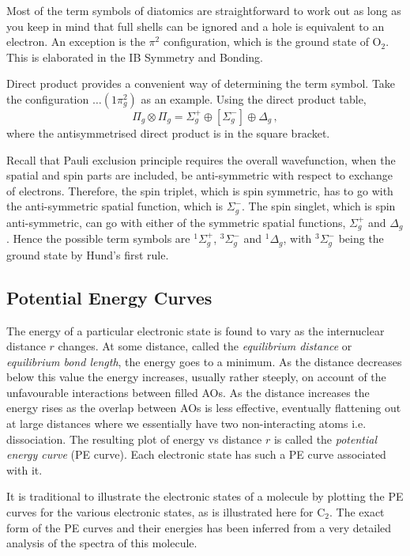 \documentclass{article}
\theoremstyle{plain}\theoremheaderfont{\normalfont\itshape}\theorembodyfont{\rmfamily}\theoremseparator{.}\newtheorem*{rem}{Remark}\newtheorem*{ex}{Example}\newtheorem*{proof}{Proof}\newtheorem*{altp}{Alternative proof}
\theoremstyle{plain}\theoremheaderfont{\normalfont\bfseries}\theorembodyfont{\rmfamily}\theoremseparator{.}\newtheorem{thm}{Theorem}[section]\newtheorem{lem}[thm]{Lemma}\newtheorem{prop}[thm]{Proposition}\newtheorem*{cor}{Corollary}\newtheorem{defn}[thm]{Definition}\newtheorem{clm}[thm]{Claim}\newtheorem{clminproof}{Claim}\newtheorem{pos}{Postulate}[section]
\theoremstyle{break}\theoremheaderfont{\normalfont\itshape}\theorembodyfont{\rmfamily}\theoremseparator{.\medskip}\newtheorem*{proofskip}{Proof}\newtheorem*{exs}{Examples}\newtheorem*{rems}{Remarks}
\theoremstyle{break}\theoremheaderfont{\normalfont\bfseries}\theorembodyfont{\rmfamily}\theoremseparator{.\medskip}\newtheorem{lemskip}[thm]{Lemma}\newtheorem{defnskip}[thm]{Definition}\newtheorem{propskip}[thm]{Proposition}\newtheorem{thmskip}[thm]{Theorem}
\numberwithin{equation}{section}
\begin{document}
    Most of the term symbols of diatomics are straightforward to work out as long as you keep in mind that full shells can be ignored and a hole is equivalent to an electron. An exception is the \(\pi^2\) configuration, which is the ground state of \(\mathrm{O}_2\). This is elaborated in the IB Symmetry and Bonding.

    Direct product provides a convenient way of determining the term symbol. Take the configuration \(\dots(1\pi_g^2)\) as an example. Using the direct product table,
    \begin{equation}
        \Pi_g\otimes\Pi_g=\Sigma_g^+\oplus[\Sigma_g^-]\oplus\Delta_g\,,
    \end{equation}
    where the antisymmetrised direct product is in the square bracket.

    Recall that Pauli exclusion principle requires the overall wavefunction, when the spatial and spin parts are included, be anti-symmetric with respect to exchange of electrons. Therefore, the spin triplet, which is spin symmetric, has to go with the anti-symmetric spatial function, which is \(\Sigma_g^-\). The spin singlet, which is spin anti-symmetric, can go with either of the symmetric spatial functions, \(\Sigma_g^+\) and \(\Delta_g\). Hence the possible term symbols are \(^1\Sigma_g^+\), \(^3\Sigma_g^-\) and \(^1\Delta_g\), with \(^3\Sigma_g^-\) being the ground state by Hund's first rule.

    \subsection{Potential Energy Curves}
    The energy of a particular electronic state is found to vary as the internuclear distance \(r\) changes. At some distance, called the \textit{equilibrium distance} or \textit{equilibrium bond length}, the energy goes to a minimum. As the distance decreases below this value the energy increases, usually rather steeply, on account of the unfavourable interactions between filled AOs. As the distance increases the energy rises as the overlap between AOs is less effective, eventually flattening out at large distances where we essentially have two non-interacting atoms i.e. dissociation. The resulting plot of energy vs distance \(r\) is called the \textit{potential energy curve} (PE curve). Each electronic state has such a PE curve associated with it.

    It is traditional to illustrate the electronic states of a molecule by plotting the PE curves for the various electronic states, as is illustrated here for \(\mathrm{C_2}\). The exact form of the PE curves and their energies has been inferred from a very detailed analysis of the spectra of this molecule.
\end{document}
